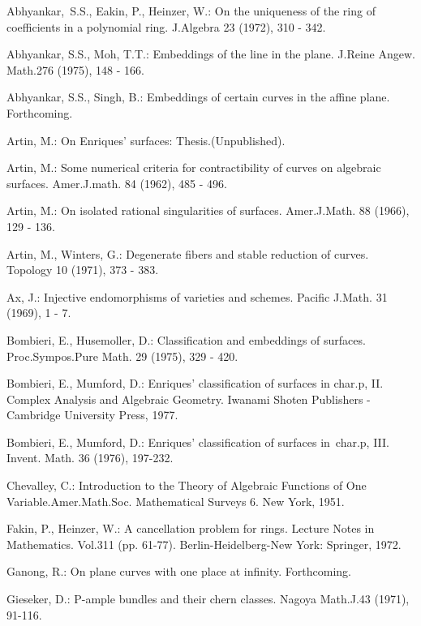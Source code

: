 \begin{thebibliography}{99}
 Abhyankar,\pageoriginale\  S.\@ S., Eakin, P., Heinzer, W.: On the uniqueness of
  the ring of coefficients in a polynomial ring. J.\@ Algebra 23
  (1972), 310 - 342.

 Abhyankar, S.\@ S., Moh, T.\@ T.: Embeddings of the line in the
  plane. J.\@ Reine Angew. Math.\@ 276 (1975), 148 - 166.

 Abhyankar, S.\@ S., Singh, B.: Embeddings of certain curves in
  the affine plane. Forthcoming.

 Artin, M.: On Enriques' surfaces: Thesis.\@ (Unpublished).

 Artin, M.: Some numerical criteria for contractibility of curves
  on algebraic surfaces. Amer.\@ J.\@ math. 84 (1962), 485 - 496.

 Artin, M.: On isolated rational singularities of
  surfaces. Amer.\@ J.\@ Math. 88 (1966), 129 - 136.

 Artin, M., Winters, G.: Degenerate fibers and stable reduction
  of curves. Topology 10 (1971), 373 - 383.

 Ax, J.: Injective endomorphisms of varieties and
  schemes. Pacific J.\@ Math. 31 (1969), 1 - 7.

 Bombieri, E., Husemoller, D.: Classification and embeddings of
  surfaces. Proc.\@ Sympos.\@ Pure Math. 29 (1975), 329 - 420.

 Bombieri, E., Mumford, D.: Enriques' classification of surfaces
  in char.\@ p, II. Complex Analysis and Algebraic Geometry. Iwanami
  Shoten Publishers - Cambridge University Press, 1977.

 Bombieri, E., Mumford, D.: Enriques' classification of surfaces
  in\pageoriginale\ char.\@ p, III. Invent. Math. 36 (1976), 197-232.

 Chevalley, C.: Introduction to the Theory of Algebraic Functions
  of One Variable.\@ Amer.\@ Math.\@ Soc. Mathematical Surveys 6. New
  York, 1951.

 Fakin, P., Heinzer, W.: A cancellation problem for
  rings. Lecture Notes in Mathematics. Vol.\@ 311 (pp.\@
  61-77). Berlin-Heidelberg-New York: Springer, 1972.

 Ganong, R.: On plane curves with one place at
  infinity. Forthcoming.

 Gieseker, D.: P-ample bundles and their chern classes. Nagoya
  Math.\@ J.\@ 43 (1971), 91-116.


\end{thebibliography}
